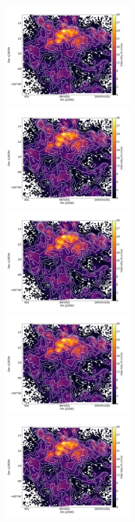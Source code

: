 \documentclass[traditabstract]{aa}
\begin{document}
\begin{figure}[h]
  \centering
  \includegraphics[page=1,height=4.5cm,trim=50 40 50 40,clip=true]{Figures/CO10_intensity.pdf}
  \hspace{3mm}
  \includegraphics[page=4,height=4.5cm,trim=50 40 50 40,clip=true]{Figures/CO10_intensity.pdf} \\
  \includegraphics[page=2,height=4.5cm,trim=50 40 50 40,clip=true]{Figures/CO10_intensity.pdf}
  \hspace{3mm}
  \includegraphics[page=5,height=4.5cm,trim=50 40 50 40,clip=true]{Figures/CO10_intensity.pdf} \\
  \includegraphics[page=3,height=4.5cm,trim=50 40 50 40,clip=true]{Figures/CO10_intensity.pdf}

\end{figure}
\end{document}
